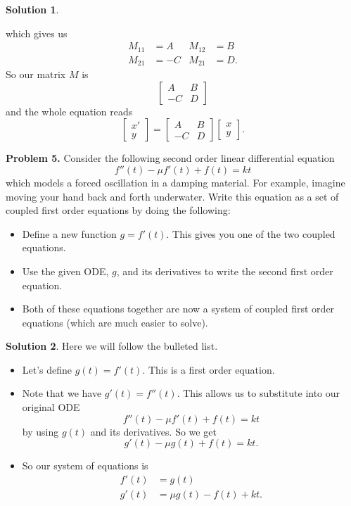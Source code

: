 \documentclass[12pt]{report} %
\theoremstyle{definition}
\newtheorem{solution}{Solution}
\begin{document}
\begin{solution}
\begin{enumerate}[(a)]
\[    \]
    which gives us
    \begin{align*}
        M_{11} &= A & M_{12} &= B\\
        M_{21} &= -C & M_{21} &= D.
    \end{align*}
    So our matrix $M$ is
    \[
    \begin{bmatrix} A & B \\ -C & D \end{bmatrix}
    \]
    and the whole equation reads
    \[
    \begin{bmatrix} x' \\ y\ \end{bmatrix} = \begin{bmatrix} A & B \\ -C & D \end{bmatrix} \begin{bmatrix} x \\ y \end{bmatrix}.
    \]
\end{enumerate}
\end{solution}
\vspace*{.5cm}

\noindent\textbf{Problem 5.} Consider the following second order linear differential equation
\[
f''(t)-\mu f'(t) + f(t) = kt
\]
which models a forced oscillation in a damping material.  For example, imagine moving your hand back and forth underwater.  Write this equation as a set of coupled first order equations by doing the following:
\begin{itemize}
    \item Define a new function $g=f'(t)$.  This gives you one of the two coupled equations.
    \item Use the given ODE, $g$, and its derivatives to write the second first order equation.
    \item Both of these equations together are now a system of coupled first order equations (which are much easier to solve).
\end{itemize}

\begin{solution}
Here we will follow the bulleted list.
\begin{itemize}
    \item Let's define $g(t)=f'(t)$.  This is a first order equation.
    \item Note that we have $g'(t)=f''(t)$.  This allows us to substitute into our original ODE
    \[
    f''(t)-\mu f'(t)+f(t)=kt
    \]
    by using $g(t)$ and its derivatives. So we get
    \[
    g'(t)-\mu g(t) + f(t) = kt.
    \]
    \item So our system of equations is
    \begin{align}
        f'(t)&=g(t)\\
        g'(t)&= \mu g(t) - f(t) + kt.
    \end{align}
\end{itemize}
\end{solution}
\end{document}
